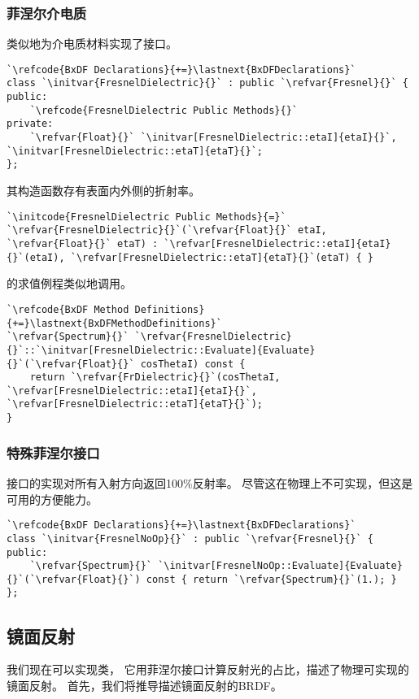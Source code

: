 \subsubsection*{菲涅尔介电质}
类似地为介电质材料实现了接口。
\begin{lstlisting}
`\refcode{BxDF Declarations}{+=}\lastnext{BxDFDeclarations}`
class `\initvar{FresnelDielectric}{}` : public `\refvar{Fresnel}{}` {
public:
    `\refcode{FresnelDielectric Public Methods}{}`
private:
    `\refvar{Float}{}` `\initvar[FresnelDielectric::etaI]{etaI}{}`, `\initvar[FresnelDielectric::etaT]{etaT}{}`;
};
\end{lstlisting}

其构造函数存有表面内外侧的折射率。
\begin{lstlisting}
`\initcode{FresnelDielectric Public Methods}{=}`
`\refvar{FresnelDielectric}{}`(`\refvar{Float}{}` etaI, `\refvar{Float}{}` etaT) : `\refvar[FresnelDielectric::etaI]{etaI}{}`(etaI), `\refvar[FresnelDielectric::etaT]{etaT}{}`(etaT) { }
\end{lstlisting}

的求值例程类似地调用。
\begin{lstlisting}
`\refcode{BxDF Method Definitions}{+=}\lastnext{BxDFMethodDefinitions}`
`\refvar{Spectrum}{}` `\refvar{FresnelDielectric}{}`::`\initvar[FresnelDielectric::Evaluate]{Evaluate}{}`(`\refvar{Float}{}` cosThetaI) const {
    return `\refvar{FrDielectric}{}`(cosThetaI, `\refvar[FresnelDielectric::etaI]{etaI}{}`, `\refvar[FresnelDielectric::etaT]{etaT}{}`);
}
\end{lstlisting}

\subsubsection*{特殊菲涅尔接口}
接口的实现对所有入射方向返回100\%反射率。
尽管这在物理上不可实现，但这是可用的方便能力。
\begin{lstlisting}
`\refcode{BxDF Declarations}{+=}\lastnext{BxDFDeclarations}`
class `\initvar{FresnelNoOp}{}` : public `\refvar{Fresnel}{}` {
public:
    `\refvar{Spectrum}{}` `\initvar[FresnelNoOp::Evaluate]{Evaluate}{}`(`\refvar{Float}{}`) const { return `\refvar{Spectrum}{}`(1.); }
};
\end{lstlisting}

\subsection{镜面反射}\label{sub:镜面反射}
我们现在可以实现类，
它用菲涅尔接口计算反射光的占比，描述了物理可实现的镜面反射。
首先，我们将推导描述镜面反射的BRDF。

